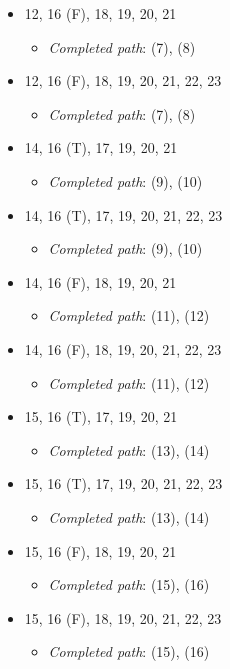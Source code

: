 \documentclass{article}
\newcommand{\completedpath}{\textit{Completed path}}
\begin{document}
\begin{itemize}
\begin{itemize}
    \end{itemize}
    \item 12, 16 (F), 18, 19, 20, 21
    \begin{itemize}
        \item \completedpath: (7), (8)
    \end{itemize}
    \item 12, 16 (F), 18, 19, 20, 21, 22, 23 
    \begin{itemize}
        \item \completedpath: (7), (8)
    \end{itemize}
    \item 14, 16 (T), 17, 19, 20, 21
    \begin{itemize}
        \item \completedpath: (9), (10)
    \end{itemize}
    \item 14, 16 (T), 17, 19, 20, 21, 22, 23
    \begin{itemize}
        \item \completedpath: (9), (10)
    \end{itemize}
    \item 14, 16 (F), 18, 19, 20, 21
    \begin{itemize}
        \item \completedpath: (11), (12)
    \end{itemize}
    \item 14, 16 (F), 18, 19, 20, 21, 22, 23
    \begin{itemize}
        \item \completedpath: (11), (12)
    \end{itemize}
    \item 15, 16 (T), 17, 19, 20, 21
    \begin{itemize}
        \item \completedpath: (13), (14)
    \end{itemize}
    \item 15, 16 (T), 17, 19, 20, 21, 22, 23
    \begin{itemize}
        \item \completedpath: (13), (14)
    \end{itemize}
    \item 15, 16 (F), 18, 19, 20, 21
    \begin{itemize}
        \item \completedpath: (15), (16)
    \end{itemize}
    \item 15, 16 (F), 18, 19, 20, 21, 22, 23
    \begin{itemize}
        \item \completedpath: (15), (16)
    \end{itemize}
\end{itemize}
\end{document}
